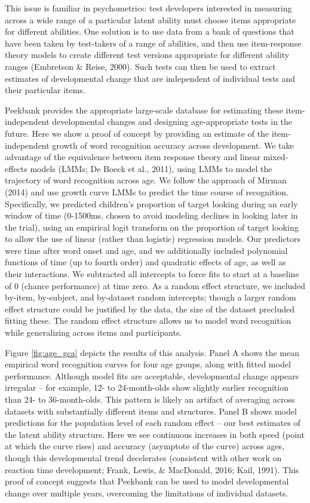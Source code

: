 \documentclass[10pt, letterpaper]{article}
\begin{document}
This issue is familiar in psychometrics: test developers interested in
measuring across a wide range of a particular latent ability must choose
items appropriate for different abilities. One solution is to use data
from a bank of questions that have been taken by test-takers of a range
of abilities, and then use item-response theory models to create
different test versions appropriate for different ability ranges
(Embretson \& Reise, 2000). Such tests can then be used to extract
estimates of developmental change that are independent of individual
tests and their particular items.

Peekbank provides the appropriate large-scale database for estimating
these item-independent developmental changes and designing
age-appropriate tests in the future. Here we show a proof of concept by
providing an estimate of the item-independent growth of word recognition
accuracy across development. We take advantage of the equivalence
between item response theory and linear mixed-effects models (LMMs; De
Boeck et al., 2011), using LMMs to model the trajectory of word
recognition across age. We follow the approach of Mirman (2014) and use
growth curve LMMs to predict the time course of recognition.
Specifically, we predicted children's proportion of target looking
during an early window of time (0-1500ms, chosen to avoid modeling
declines in looking later in the trial), using an empirical logit
transform on the proportion of target looking to allow the use of linear
(rather than logistic) regression models. Our predictors were time after
word onset and age, and we additionally included polynomial functions of
time (up to fourth order) and quadratic effects of age, as well as their
interactions. We subtracted all intercepts to force fits to start at a
baseline of 0 (chance performance) at time zero. As a random effect
structure, we included by-item, by-subject, and by-dataset random
intercepts; though a larger random effect structure could be justified
by the data, the size of the dataset precluded fitting these. The random
effect structure allows us to model word recognition while generalizing
across items and participants.

Figure \ref{fig:age_gca} depicts the results of this analysis. Panel A
shows the mean empirical word recognition curves for four age groups,
along with fitted model performance. Although model fits are acceptable,
developmental change appears irregular -- for example, 12- to
24-month-olds show slightly earlier recognition than 24- to
36-month-olds. This pattern is likely an artifact of averaging across
datasets with substantially different items and structures. Panel B
shows model predictions for the population level of each random effect
-- our best estimates of the latent ability structure. Here we see
continuous increases in both speed (point at which the curve rises) and
accuracy (asymptote of the curve) across ages, though this developmental
trend decelerates (consistent with other work on reaction time
development; Frank, Lewis, \& MacDonald, 2016; Kail, 1991). This proof
of concept suggests that Peekbank can be used to model developmental
change over multiple years, overcoming the limitations of individual
datasets.
\end{document}
